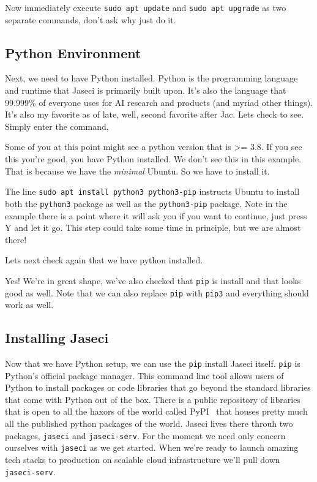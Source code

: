Now immediately execute \texttt{sudo apt update} and \texttt{sudo apt upgrade} as two separate commands, don't ask why just do it.

\subsection{Python Environment}
\par
Next, we need to have Python installed. Python is the programming language and runtime that Jaseci is primarily built upon. It's also the language that 99.999\% of everyone uses for AI research and products (and myriad other things). It's also my favorite as of late, well, second favorite after Jac. Lets check to see. Simply enter the command,
\par
{}
Some of you at this point might see a python version that is >= 3.8. If you see this you're good, you have Python installed. We don't see this in this example. That is because we have the \emph{minimal} Ubuntu. So we have to install it.
\par
{}
\par
The line \texttt{sudo apt install python3 python3-pip} instructs Ubuntu to install both the \texttt{python3} package as well as the \texttt{python3-pip} package. Note in the example there is a point where it will ask you if you want to continue, just press Y and let it go. This step could take some time in principle, but we are almost there!

\par
Lets next check again that we have python installed.
\par
{}

Yes! We're in great shape, we've also checked that \texttt{pip} is install and that looks good as well. Note that we can also replace \texttt{pip} with \texttt{pip3} and everything should work as well.

\subsection{Installing Jaseci}

Now that we have Python setup, we can use the \texttt{pip} install Jaseci itself. \texttt{pip} is Python's official package manager. This command line tool allows users of Python to install packages or code libraries that go beyond the standard libraries that come with Python out of the box. There is a public repository of libraries that is open to all the haxors of the world called PyPI~\cite{PyPI} that houses pretty much all the published python packages of the world. Jaseci lives there throuh two packages, \texttt{jaseci} and \texttt{jaseci-serv}. For the moment we need only concern ourselves with \texttt{jaseci} as we get started. When we're ready to launch amazing tech stacks to production on scalable cloud infrastructure we'll pull down \texttt{jaseci-serv}.

